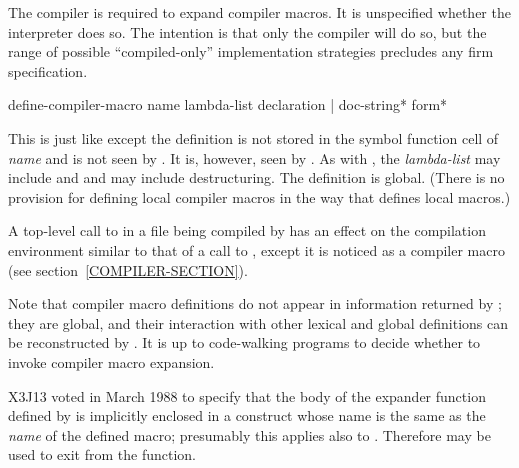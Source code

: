 The compiler is required to expand compiler macros.  It is unspecified
whether the interpreter does so.  The intention is that only the
compiler will do so, but the range of possible ``compiled-only''
implementation strategies precludes any firm specification.


\begin{defmac}
define-compiler-macro name lambda-list
                      {declaration | doc-string}* {form}*

  This is just like  except the definition is not stored in the
  symbol function cell of \emph{name} and is not seen by .
  It is, however, seen by .  As with , the
  \emph{lambda-list} may include  and 
  and may include destructuring.  The definition is
  global.  (There is no provision for defining local compiler
  macros in the way that  defines local macros.)

  A top-level call to  in a file being compiled by
   has an effect on the compilation environment similar to
  that of a call to , except it is noticed as a
  compiler macro (see section~\ref{COMPILER-SECTION}).

Note that compiler macro definitions do not appear in information returned by
; they are global, and their interaction
with other lexical and global definitions can be reconstructed by
.  It is up to code-walking programs to decide
whether to invoke compiler macro expansion.


\begin{newer}
X3J13 voted in March 1988 
to specify that the body of the expander function defined
by  is implicitly enclosed in a  construct
whose name is the same as the \emph{name} of the defined macro;
presumably this applies also to .
Therefore  may be used to exit from the function.
\end{newer}

\end{defmac}

